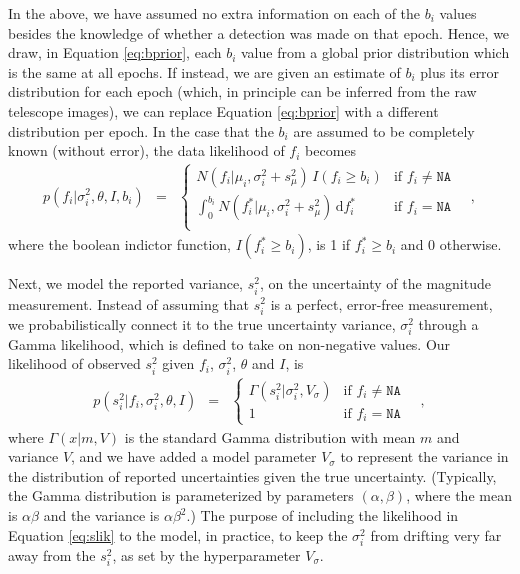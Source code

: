 \documentclass[12pt,preprint]{aastex}
\newcommand{\dd}{\mathrm{d}}
\newcommand{\fobs}{f_i}
\newcommand{\sobs}{s^2_i}
\newcommand{\ftrue}{f_i^*}
\begin{document}
In the above, we have assumed no extra information on each of the $b_i$ values besides the knowledge of whether a detection was made on that epoch.  Hence, we draw, in Equation \ref{eq:bprior}, each $b_i$ value from a global prior distribution which is the same at all epochs.  If instead, we are given an estimate of $b_i$ plus its error distribution for each epoch (which, in principle can be inferred from the raw telescope images), we can replace Equation \ref{eq:bprior} with a different distribution per epoch.  In the case that the $b_i$ are assumed to be completely known (without error), the data likelihood of $\fobs$ becomes
\begin{eqnarray}\displaystyle
p(\fobs |\sigma^2_i,\theta,I, b_i) &=& \left\{\begin{array}{ll}
  N(\fobs | \mu_i,  \sigma^2_i + s^2_{\mu})\,  I(\fobs \ge b_i) & \mbox{if $\fobs \ne \texttt{NA}$} \\
 \int_{0}^{b_i} N(\ftrue | \mu_i, \sigma^2_i + s^2_{\mu})\, \dd \ftrue & \mbox{if $\fobs = \texttt{NA}$} \\
\end{array}\right.\label{eq:mlik_s}
\quad ,
\end{eqnarray}
where the boolean indictor function, $I(\ftrue \ge b_i)$, is 1 if $\ftrue \ge b_i$ and 0 otherwise.

Next, we model the reported variance, $\sobs$, on the uncertainty of the magnitude measurement.  Instead of assuming that $\sobs$ is a perfect, error-free measurement, we probabilistically connect it to the true uncertainty variance, $\sigma^2_i$ through a Gamma likelihood, which is defined to take on non-negative values.  Our likelihood of observed $\sobs$ given $\fobs$, $\sigma^2_i$, $\theta$ and $I$, is
\begin{eqnarray}\displaystyle
p(\sobs | \fobs, \sigma^2_i, \theta,I) &=& \left\{\begin{array}{ll}
  \Gamma (\sobs | \sigma^2_i, V_{\sigma} ) & \mbox{if $\fobs \ne \texttt{NA}$} \\
 1& \mbox{if $\fobs = \texttt{NA}$}
\end{array}\right.\label{eq:slik}
\quad ,
\end{eqnarray}
where $\Gamma(x | m, V)$ is the standard Gamma distribution with mean $m$ and variance $V$,
and we have added a model parameter $V_\sigma$ to represent the
variance in the distribution of reported uncertainties given the true
uncertainty.  (Typically, the Gamma distribution is parameterized by parameters $(\alpha, \beta)$, where the mean is $\alpha\beta$ and the variance is $\alpha\beta^2$.)  The  purpose of
 including the likelihood in Equation \ref{eq:slik} to the model, in practice, to keep the $\sigma^2_i$ from
drifting very far away from the $\sobs$, as set by the hyperparameter
$V_\sigma$.
\end{document}
